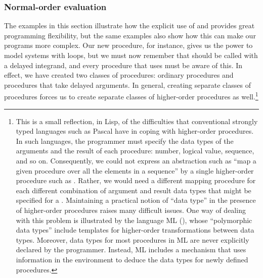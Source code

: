 \subsubsection*{Normal-order evaluation}

The examples in this section illustrate how the explicit use of 
and  provides great programming flexibility, but the same examples
also show how this can make our programs more complex.  Our new 
procedure, for instance, gives us the power to model systems with loops, but we
must now remember that  should be called with a delayed
integrand, and every procedure that uses  must be aware of this.
In effect, we have created two classes of procedures: ordinary procedures and
procedures that take delayed arguments.  In general, creating separate classes
of procedures forces us to create separate classes of higher-order procedures
as well.\footnote{This is a small reflection, in Lisp, of the difficulties that
conventional strongly typed languages such as Pascal have in coping with
higher-order procedures.  In such languages, the programmer must specify the
data types of the arguments and the result of each procedure: number, logical
value, sequence, and so on.  Consequently, we could not express an abstraction
such as ``map a given procedure  over all the elements in a
sequence'' by a single higher-order procedure such as .
Rather, we would need a different mapping procedure for each different
combination of argument and result data types that might be specified for a
.  Maintaining a practical notion of ``data type'' in the presence
of higher-order procedures raises many difficult issues.  One way of dealing
with this problem is illustrated by the language ML (),
whose ``polymorphic data types'' include templates for
higher-order transformations between data types.  Moreover, data types for most
procedures in ML are never explicitly declared by the programmer.  Instead, ML
includes a  mechanism that uses information in the
environment to deduce the data types for newly defined procedures.}

